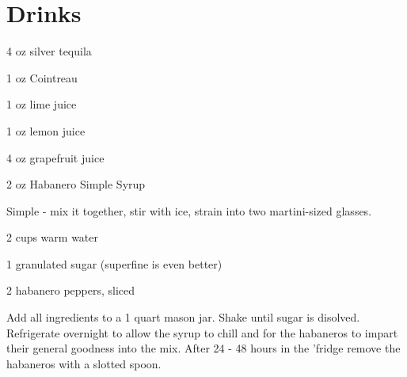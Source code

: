 \chapter{Drinks}


%
%
%
%
\newpage



\begin{IngredientsAndSteps}
    \ListIngredientsAndSteps
    {
        4 oz silver tequila

        1 oz Cointreau

        1 oz lime juice

        1 oz lemon juice

        4 oz grapefruit juice

        2 oz Habanero Simple Syrup
    }
    {
        Simple - mix it together, stir with ice, strain into two martini-sized glasses.
    }
\end{IngredientsAndSteps}

%
%
%
%
\newpage



\begin{IngredientsAndSteps}
    \ListIngredientsAndSteps
    {
        2 cups warm water

        1 granulated sugar (superfine is even better)

        2 habanero peppers, sliced
    }
    {
        Add all ingredients to a 1 quart mason jar. Shake until sugar is disolved. Refrigerate
        overnight to allow the syrup to chill and for the habaneros to impart their general
        goodness into the mix. After 24 - 48 hours in the 'fridge remove the habaneros with a
        slotted spoon.
    }
\end{IngredientsAndSteps}

